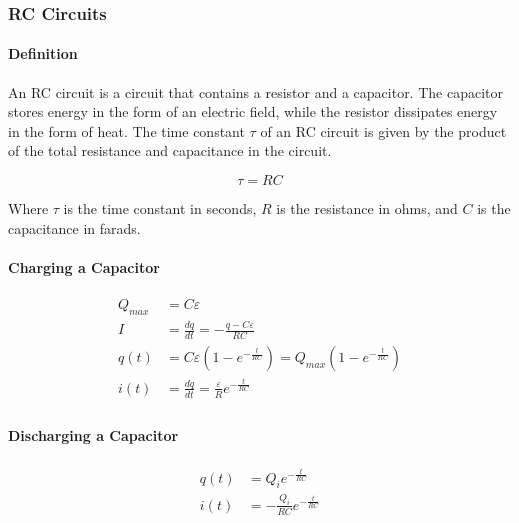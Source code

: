 \hrulefill

\subsubsection*{RC Circuits}

\paragraph*{Definition}
An RC circuit is a circuit that contains a resistor and a capacitor. The capacitor stores energy in the form of an electric field, 
while the resistor dissipates energy in the form of heat. The time constant $\tau$ of an RC circuit is given by the product of the 
total resistance and capacitance in the circuit.

\begin{equation*}
    \tau = RC
\end{equation*}

Where $\tau$ is the time constant in seconds, $R$ is the resistance in ohms, and $C$ is the capacitance in farads. 

\paragraph*{Charging a Capacitor}

\begin{align*}
    Q_{max} &= C\varepsilon\\
    I &= \frac{dq}{dt} = -\frac{q-C\varepsilon}{RC}\\
    q(t) &= C\varepsilon(1-e^{-\frac{t}{RC}}) = Q_{max}(1-e^{-\frac{t}{RC}})\\
    i(t) &= \frac{dq}{dt} = \frac{\varepsilon}{R}e^{-\frac{t}{RC}}\\
\end{align*}

\paragraph*{Discharging a Capacitor}
\begin{align*}
    q(t) &= Q_ie^{-\frac{t}{RC}}\\
    i(t) &= -\frac{Q_i}{RC}e^{-\frac{t}{RC}}\\
\end{align*}

